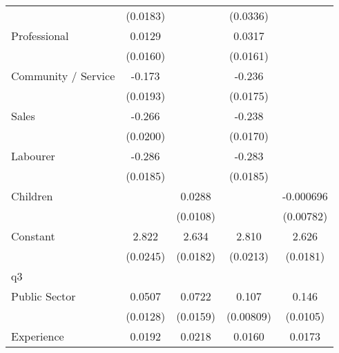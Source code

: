 {\begin{tabular}{l*{4}{c}}
                    &    (0.0183)         &                     &    (0.0336)         &                     \\
[1em]
Professional        &      0.0129         &                     &      0.0317\sym{*}  &                     \\
                    &    (0.0160)         &                     &    (0.0161)         &                     \\
[1em]
Community / Service &      -0.173\sym{***}&                     &      -0.236\sym{***}&                     \\
                    &    (0.0193)         &                     &    (0.0175)         &                     \\
[1em]
Sales               &      -0.266\sym{***}&                     &      -0.238\sym{***}&                     \\
                    &    (0.0200)         &                     &    (0.0170)         &                     \\
[1em]
Labourer            &      -0.286\sym{***}&                     &      -0.283\sym{***}&                     \\
                    &    (0.0185)         &                     &    (0.0185)         &                     \\
[1em]
Children            &                     &      0.0288\sym{**} &                     &   -0.000696         \\
                    &                     &    (0.0108)         &                     &   (0.00782)         \\
[1em]
Constant            &       2.822\sym{***}&       2.634\sym{***}&       2.810\sym{***}&       2.626\sym{***}\\
                    &    (0.0245)         &    (0.0182)         &    (0.0213)         &    (0.0181)         \\
\hline
q3                  &                     &                     &                     &                     \\
Public Sector       &      0.0507\sym{***}&      0.0722\sym{***}&       0.107\sym{***}&       0.146\sym{***}\\
                    &    (0.0128)         &    (0.0159)         &   (0.00809)         &    (0.0105)         \\
[1em]
Experience          &      0.0192\sym{***}&      0.0218\sym{***}&      0.0160\sym{***}&      0.0173\sym{***}\\

\end{tabular}}
